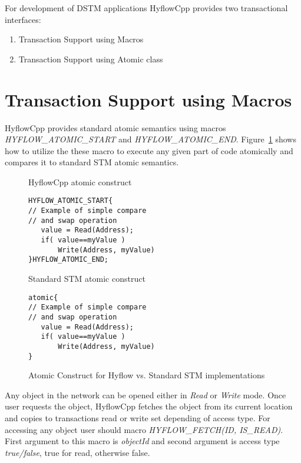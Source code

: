 \documentclass[12pt,english]{report}
\begin{document}
For development of DSTM applications HyflowCpp provides two transactional interfaces: 
\begin{enumerate}
\item Transaction Support using Macros
\item Transaction Support using Atomic class 
\end{enumerate}

\section{Transaction Support using Macros}

HyflowCpp provides standard atomic semantics using macros \emph{HYFLOW{\_}ATOMIC{\_}START} and \emph{HYFLOW{\_}ATOMIC{\_}END}. Figure~\ref{Fig:atomicConstr} shows how to utilize the these macro to execute any given part of code atomically and compares it to standard STM atomic semantics. 

\begin{figure}
\centering 
\begin{footnotesize}
\begin{minipage}[b]{0.45\linewidth}\centering
HyflowCpp atomic construct 
\begin{lstlisting}
HYFLOW_ATOMIC_START{
// Example of simple compare
// and swap operation
   value = Read(Address);
   if( value==myValue )
       Write(Address, myValue)
}HYFLOW_ATOMIC_END;
\end{lstlisting} 
\end{minipage} 
\begin{minipage}[b]{0.45\linewidth}\centering
Standard STM atomic construct
\begin{lstlisting}   					   
atomic{
// Example of simple compare
// and swap operation
   value = Read(Address);
   if( value==myValue )
       Write(Address, myValue)
}
\end{lstlisting}			  
\end{minipage}
\end{footnotesize}
\label{Fig:atomicConstr}\caption{Atomic Construct for Hyflow vs. Standard STM implementations}
\end{figure}

Any object in the network can be opened either in \emph{Read} or \emph{Write} mode. Once user requests the object, HyflowCpp fetches the object from its current location and copies to transactions read or write set depending of access type. For accessing any object user should macro \emph{HYFLOW{\_}FETCH(ID, IS{\_}READ)}. First argument to this macro is \emph{objectId} and second argument is access type \emph{true/false}, true for read, otherwise false.
\end{document}
